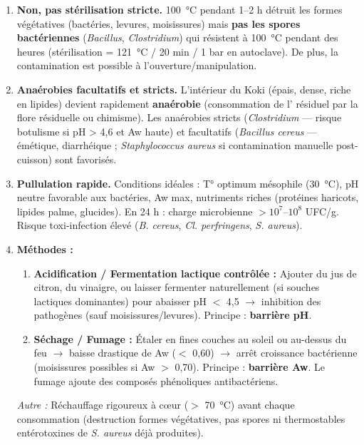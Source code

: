 \documentclass[11pt]{article}
\begin{document}
\begin{corrige}
\begin{enumerate}
    \item \textbf{Non, pas stérilisation stricte.} \SI{100}{\degreeCelsius} pendant 1--2 h détruit les formes végétatives (bactéries, levures, moisissures) mais \textbf{pas les spores bactériennes} (\emph{Bacillus}, \emph{Clostridium}) qui résistent à \SI{100}{\degreeCelsius} pendant des heures (stérilisation = \SI{121}{\degreeCelsius} / 20 min / 1 bar en autoclave). De plus, la contamination est possible à l'ouverture/manipulation.
    \item \textbf{Anaérobies facultatifs et stricts.} L'intérieur du Koki (épais, dense, riche en lipides) devient rapidement \textbf{anaérobie} (consommation de l' résiduel par la flore résiduelle ou chimisme). Les anaérobies stricts (\emph{Clostridium} — risque botulisme si pH > 4,6 et Aw haute) et facultatifs (\emph{Bacillus cereus} — émétique, diarrhéique ; \emph{Staphylococcus aureus} si contamination manuelle post-cuisson) sont favorisés.
    \item \textbf{Pullulation rapide.} Conditions idéales : T° optimum mésophile (\SI{30}{\degreeCelsius}), pH neutre favorable aux bactéries, Aw max, nutriments riches (protéines haricots, lipides palme, glucides). En 24 h : charge microbienne $> 10^7$--$10^8$ UFC/g. Risque toxi-infection élevé (\emph{B. cereus}, \emph{Cl. perfringens}, \emph{S. aureus}).
    \item \textbf{Méthodes :}
        \begin{enumerate}
            \item \textbf{Acidification / Fermentation lactique contrôlée :} Ajouter du jus de citron, du vinaigre, ou laisser fermenter naturellement (si souches lactiques dominantes) pour abaisser pH $<$ 4,5 $\rightarrow$ inhibition des pathogènes (sauf moisissures/levures). Principe : \textbf{barrière pH}.
            \item \textbf{Séchage / Fumage :} Étaler en fines couches au soleil ou au-dessus du feu $\rightarrow$ baisse drastique de Aw ($<$ 0,60) $\rightarrow$ arrêt croissance bactérienne (moisissures possibles si Aw $>$ 0,70). Principe : \textbf{barrière Aw}. Le fumage ajoute des composés phénoliques antibactériens.
        \end{enumerate}
        \textit{Autre :} Réchauffage rigoureux à cœur ($>$ \SI{70}{\degreeCelsius}) avant chaque consommation (destruction formes végétatives, pas spores ni thermostables entérotoxines de \emph{S. aureus} déjà produites).
\end{enumerate}
\end{corrige}
\end{document}
